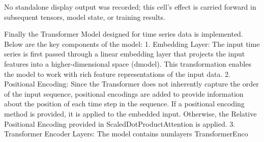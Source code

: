 \documentclass[../labs.tex]{subfiles}
\begin{document}
\hypertarget{res:lab02-text-02-attention-ipynb-21-1686fa7cdd0e}{}\noindent No standalone display output was recorded; this cell’s effect is carried forward in subsequent tensors, model state, or training results.



\noindent Finally the Transformer Model designed for time series data is implemented. Below are the key components of the model: 1. Embedding Layer: The input time series is first passed through a linear embedding layer that projects the input features into a higher-dimensional space (dmodel). This transformation enables the model to work with rich feature representations of the input data. 2. Positional Encoding: Since the Transformer does not inherently capture the order of the input sequence, positional encodings are added to provide information about the position of each time step in the sequence. If a positional encoding method is provided, it is applied to the embedded input. Otherwise, the Relative Positional Encoding provided in ScaledDotProductAttention is applied. 3. Transformer Encoder Layers: The model contains numlayers TransformerEnco
\end{document}
